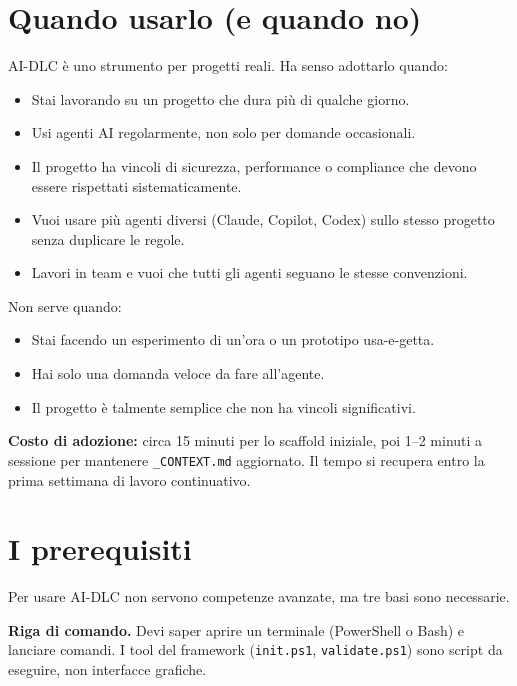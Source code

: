 \section{Quando usarlo (e quando no)}
\label{sec:01-quando-usarlo}

AI-DLC è uno strumento per progetti reali. Ha senso adottarlo quando:

\begin{itemize}
  \item Stai lavorando su un progetto che dura più di qualche giorno.
  \item Usi agenti AI regolarmente, non solo per domande occasionali.
  \item Il progetto ha vincoli di sicurezza, performance o compliance che devono essere rispettati sistematicamente.
  \item Vuoi usare più agenti diversi (Claude, Copilot, Codex) sullo stesso progetto senza duplicare le regole.
  \item Lavori in team e vuoi che tutti gli agenti seguano le stesse convenzioni.
\end{itemize}

Non serve quando:

\begin{itemize}
  \item Stai facendo un esperimento di un'ora o un prototipo usa-e-getta.
  \item Hai solo una domanda veloce da fare all'agente.
  \item Il progetto è talmente semplice che non ha vincoli significativi.
\end{itemize}

\begin{tipbox}
\textbf{Costo di adozione:} circa 15 minuti per lo scaffold iniziale, poi 1--2 minuti a sessione per mantenere \texttt{\_CONTEXT.md} aggiornato. Il tempo si recupera entro la prima settimana di lavoro continuativo.
\end{tipbox}

\section{I prerequisiti}
\label{sec:01-prerequisiti}

Per usare AI-DLC non servono competenze avanzate, ma tre basi sono necessarie.

\textbf{Riga di comando.} Devi saper aprire un terminale (PowerShell o Bash) e lanciare comandi. I tool del framework (\texttt{init.ps1}, \texttt{validate.ps1}) sono script da eseguire, non interfacce grafiche.

